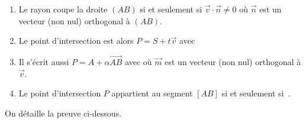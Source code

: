 \documentclass[11pt,class=report,crop=false]{standalone}
\begin{document}

\begin{proposition}
\sauteligne
\begin{enumerate}
  \item Le rayon coupe la droite $(AB)$ si et seulement si $\vec v \cdot \vec n \neq 0$ où $\vec n$ est un vecteur (non nul) orthogonal à $(AB)$.
  \item Le point d'intersection est alors $P = S + t\vec v$ avec 
  \item Il s'écrit aussi $P = A + \alpha \overrightarrow{AB}$ avec 
  où $\vec m$ est un vecteur (non nul) orthogonal à $\vec v$.
  \item Le point d'intersection $P$ appartient au segment $[AB]$ si et seulement si \,.
\end{enumerate}
\end{proposition}

On détaille la preuve ci-dessous.
\end{document}
